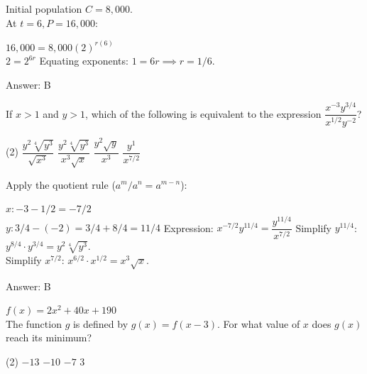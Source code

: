 \documentclass[11pt,paper=a4,answers]{exam}
\begin{document}
\begin{questions}
\begin{solution}
Initial population $C = 8,000$. \\
At $t = 6, P = 16,000$:
\vspace{5pt}
\begin{center}
$16,000 = 8,000(2)^{r(6)}$ \\
$2 = 2^{6r}$
\vspace{5pt}
Equating exponents: $1 = 6r \implies r = 1/6$.
\end{center}
\vspace{5pt}
Answer: \colorbox{yellow!100}{B}
\end{solution}

\vspace{1cm}

\question
If $x > 1$ and $y > 1$, which of the following is equivalent to the expression $\dfrac{x^{-3} y^{3/4}}{x^{1/2} y^{-2}}$?
\begin{tasks}(2)
    \task $\dfrac{y^2 \sqrt[4]{y^3}}{\sqrt{x^3}}$
    \task $\dfrac{y^2 \sqrt[4]{y^3}}{x^3 \sqrt{x}}$
    \task $\dfrac{y^2 \sqrt{y}}{x^3}$
    \task $\dfrac{y^1}{x^{7/2}}$
\end{tasks}

\begin{solution}
Apply the quotient rule ($a^m / a^n = a^{m-n}$):
\vspace{5pt}
\begin{center}
$x: -3 - 1/2 = -7/2$ \\
$y: 3/4 - (-2) = 3/4 + 8/4 = 11/4$
\vspace{5pt}
Expression: $x^{-7/2} y^{11/4} = \dfrac{y^{11/4}}{x^{7/2}}$
\vspace{5pt}
Simplify $y^{11/4}$: $y^{8/4} \cdot y^{3/4} = y^2 \sqrt[4]{y^3}$. \\
Simplify $x^{7/2}$: $x^{6/2} \cdot x^{1/2} = x^3 \sqrt{x}$.
\end{center}
\vspace{5pt}
Answer: \colorbox{yellow!100}{B}
\end{solution}

\vspace{1cm}

\question
$f(x) = 2x^2 + 40x + 190$ \\
The function $g$ is defined by $g(x) = f(x - 3)$. For what value of $x$ does $g(x)$ reach its minimum?
\begin{tasks}(2)
    \task $-13$ \task $-10$ \task $-7$ \task $3$
\end{tasks}


\end{questions}
\end{document}
